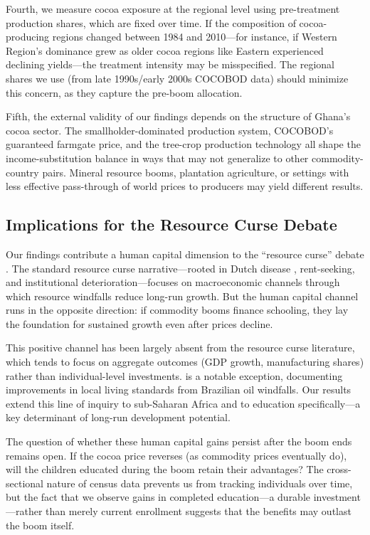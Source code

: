\documentclass[12pt]{article}
\begin{document}
Fourth, we measure cocoa exposure at the regional level using pre-treatment production shares, which are fixed over time. If the composition of cocoa-producing regions changed between 1984 and 2010---for instance, if Western Region's dominance grew as older cocoa regions like Eastern experienced declining yields---the treatment intensity may be misspecified. The regional shares we use (from late 1990s/early 2000s COCOBOD data) should minimize this concern, as they capture the pre-boom allocation.

Fifth, the external validity of our findings depends on the structure of Ghana's cocoa sector. The smallholder-dominated production system, COCOBOD's guaranteed farmgate price, and the tree-crop production technology all shape the income-substitution balance in ways that may not generalize to other commodity-country pairs. Mineral resource booms, plantation agriculture, or settings with less effective pass-through of world prices to producers may yield different results.

\subsection{Implications for the Resource Curse Debate}

Our findings contribute a human capital dimension to the ``resource curse'' debate \citep{vanderploeg2011}. The standard resource curse narrative---rooted in Dutch disease \citep{corden1982}, rent-seeking, and institutional deterioration---focuses on macroeconomic channels through which resource windfalls reduce long-run growth. But the human capital channel runs in the opposite direction: if commodity booms finance schooling, they lay the foundation for sustained growth even after prices decline.

This positive channel has been largely absent from the resource curse literature, which tends to focus on aggregate outcomes (GDP growth, manufacturing shares) rather than individual-level investments. \citet{aragoncaselli2013} is a notable exception, documenting improvements in local living standards from Brazilian oil windfalls. Our results extend this line of inquiry to sub-Saharan Africa and to education specifically---a key determinant of long-run development potential.

The question of whether these human capital gains persist after the boom ends remains open. If the cocoa price reverses (as commodity prices eventually do), will the children educated during the boom retain their advantages? The cross-sectional nature of census data prevents us from tracking individuals over time, but the fact that we observe gains in completed education---a durable investment---rather than merely current enrollment suggests that the benefits may outlast the boom itself.
\end{document}
